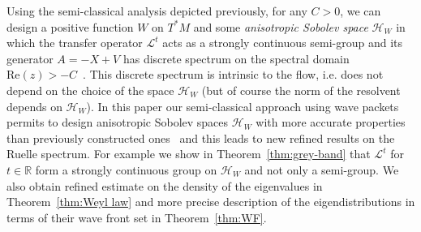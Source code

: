 \documentclass[10pt]{amsart}
\theoremstyle{definition}\newtheorem{defi}[theo]{Definition}\newtheorem{rema}[theo]{Remark}\newtheorem{exam}[theo]{Example}\newtheorem{exem}[theo]{Example}\newtheorem{nota}[theo]{Notation}
\newcommand{\clH}{\mathcal{H}}
\newcommand{\clL}{\mathcal{L}}
\newcommand{\Ree}{\mathrm{Re}}
\newcommand{\bbR}{\mathbb{R}}
\begin{document}
Using the semi-classical analysis depicted previously, for any $C>0$, we can design a positive function $W$ on $T^{*}M$ and some \emph{anisotropic Sobolev space} $\clH _{W}$ in which the transfer operator $\clL^{t}$ acts as a strongly continuous semi-group and its generator $A=-X+V$ has discrete spectrum on the spectral domain $\Ree(z)>-C$~\cite{liverani_butterley_07,fred_flow_09}. This discrete spectrum is intrinsic to the flow, i.e. does not depend on the choice of the space $\clH _{W}$ (but of course the norm of the resolvent depends on $\clH _{W}$). In this paper our semi-classical approach using wave packets permits to design anisotropic Sobolev spaces $\clH _{W}$ with more accurate properties than previously constructed ones~\cite{fred_flow_09} and this leads to new refined results on the Ruelle spectrum. For example we show in Theorem~\ref{thm:grey-band} that $\clL^{t}$ for $t\in\bbR$ form a strongly continuous group on $\clH _{W}$ and not only a semi-group. We also obtain refined estimate on the density of the eigenvalues in Theorem~\ref{thm:Weyl law} and more precise description of the eigendistributions in terms of their wave front set in Theorem~\ref{thm:WF}.
\end{document}
